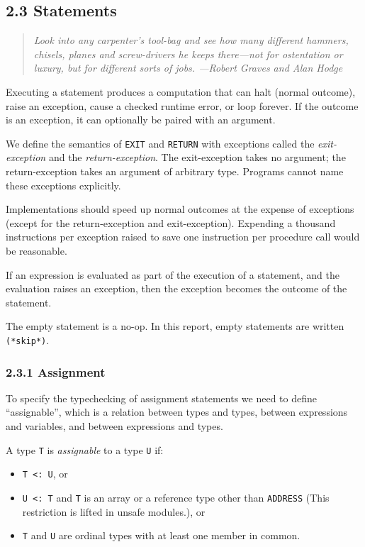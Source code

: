\documentclass[10pt]{article}
\begin{document}
\subsection*{2.3 Statements}

\begin{quote}
  \emph{Look into any carpenter's tool-bag and see how many different hammers,
    chisels, planes and screw-drivers he keeps there---not for ostentation or
    luxury, but for different sorts of jobs.  ---Robert Graves and Alan Hodge}
\end{quote}

Executing a statement produces a computation that can halt (normal outcome),
raise an exception, cause a checked runtime error, or loop forever.  If the
outcome is an exception, it can optionally be paired with an argument.

We define the semantics of \verb|EXIT| and \verb|RETURN| with exceptions
called the \emph{exit-exception} and the \emph{return-exception}.  The
exit-exception takes no argument; the return-exception takes an argument of
arbitrary type.  Programs cannot name these exceptions explicitly.

Implementations should speed up normal outcomes at the expense of exceptions
(except for the return-exception and exit-exception).  Expending a thousand
instructions per exception raised to save one instruction per procedure call
would be reasonable.

If an expression is evaluated as part of the execution of a statement, and the
evaluation raises an exception, then the exception becomes the outcome of the
statement.

The empty statement is a no-op.  In this report, empty statements are written
\verb|(*skip*)|.

\subsubsection*{2.3.1 Assignment}

To specify the typechecking of assignment statements we need to define
``assignable'', which is a relation between types and types, between
expressions and variables, and between expressions and types.

A type \verb|T| is \emph{assignable} to a type \verb|U| if:
\begin{itemize}
\item \verb|T <: U|, or
\item \verb|U <: T| and \verb|T| is an array or a reference type other than
  \verb|ADDRESS| (This restriction is lifted in unsafe modules.), or
\item \verb|T| and \verb|U| are ordinal types with at least one member in
  common.
\end{itemize}
\end{document}
